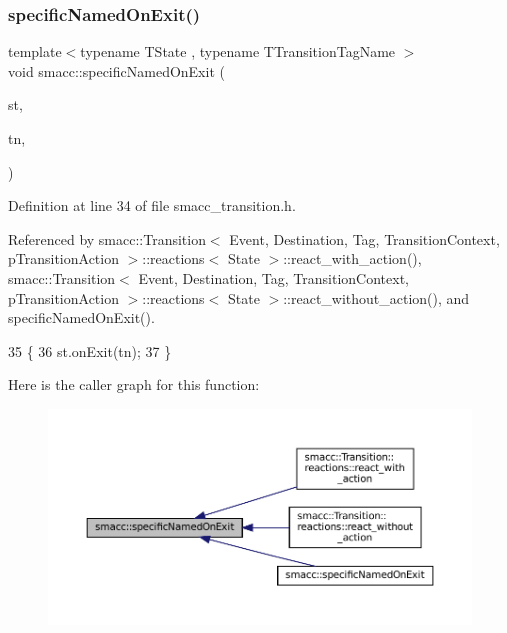 \subsubsection{\texorpdfstring{specific\+Named\+On\+Exit()}{specificNamedOnExit()}\hspace{0.1cm}{\footnotesize\ttfamily [1/3]}}
{\footnotesize\ttfamily template$<$typename T\+State , typename T\+Transition\+Tag\+Name $>$ \\
void smacc\+::specific\+Named\+On\+Exit (\begin{DoxyParamCaption}\item[{T\+State \&}]{st,  }\item[{T\+Transition\+Tag\+Name}]{tn,  }\item[{std\+::true\+\_\+type}]{ }\end{DoxyParamCaption})}



Definition at line 34 of file smacc\+\_\+transition.\+h.



Referenced by smacc\+::\+Transition$<$ Event, Destination, Tag, Transition\+Context, p\+Transition\+Action $>$\+::reactions$<$ State $>$\+::react\+\_\+with\+\_\+action(), smacc\+::\+Transition$<$ Event, Destination, Tag, Transition\+Context, p\+Transition\+Action $>$\+::reactions$<$ State $>$\+::react\+\_\+without\+\_\+action(), and specific\+Named\+On\+Exit().


\begin{DoxyCode}
35 \{
36     st.onExit(tn);
37 \}
\end{DoxyCode}
Here is the caller graph for this function\+:
\nopagebreak
\begin{figure}[H]
\begin{center}
\leavevmode
\includegraphics[width=350pt]{namespacesmacc_afd94fcb8f8c410a0ced7954bf76e845d_icgraph}
\end{center}
\end{figure}
\mbox{\label{namespacesmacc_ab1896cb023506b0a47d26d32cc078eb4}} 
